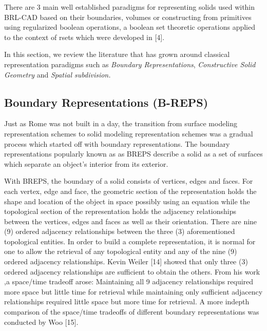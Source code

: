 There are 3 main well­ established paradigms for representing solids used
within BRL-­CAD based on their boundaries, volumes or constructing from
primitives using regularized boolean operations, a boolean set theoretic
operations applied to the context of r­sets which were developed in [4].

In this section, we review the literature that has grown around classical
representation paradigms such as \textit{Boundary   Representations}, \textit{Constructive  
Solid Geometry} and \textit{Spatial subdivision.}

\subsection{Boundary Representations (B-REPS)}

\hspace{30} Just as Rome was not built in a day, the transition from surface modeling
representation schemes   to   solid   modeling   representation   schemes   was   a  
gradual   process   which   started   off   with   boundary   representations.   The   boundary  
representations   popularly   known   as   as   B­REPS   describe   a   solid   as   a   set   of  
surfaces which separate an object's interior from its exterior. 

\hspace{30} With   B­REPS,   the   boundary   of   a   solid   consists   of   vertices,   edges   and  
faces.   For   each   vertex,   edge   and   face,   the   geometric   section   of   the  
representation   holds   the   shape   and   location   of   the   object   in   space   possibly  
using   an   equation   while   the   topological   section   of   the   representation   holds   the  
adjacency   relationships   between   the   vertices,   edges   and   faces   as   well   as   their  
orientation.   There   are   nine   (9)   ordered   adjacency   relationships   between   the  
three   (3)   aforementioned   topological   entities.   In   order   to   build   a   complete  
representation,   it   is   normal   for   one   to   allow   the   retrieval   of   any   topological   entity  
and   any   of   the   nine   (9)   ordered   adjacency   relationships.   Kevin   Weiler   [14]  
showed   that   only   three   (3)   ordered   adjacency   relationships   are   sufficient   to  
obtain   the   others.   From   his   work   ,a   space/time   trade­off   arose:   Maintaining   all   9  
adjacency   relationships   required   more   space   but   little   time   for   retrieval   while  
maintaining   only   sufficient   adjacency   relationships   required   little   space   but  
more   time   for   retrieval.   A   more   indepth   comparison   of   the   space/time  
trade­offs of different boundary representations was conducted by Woo [15].  

